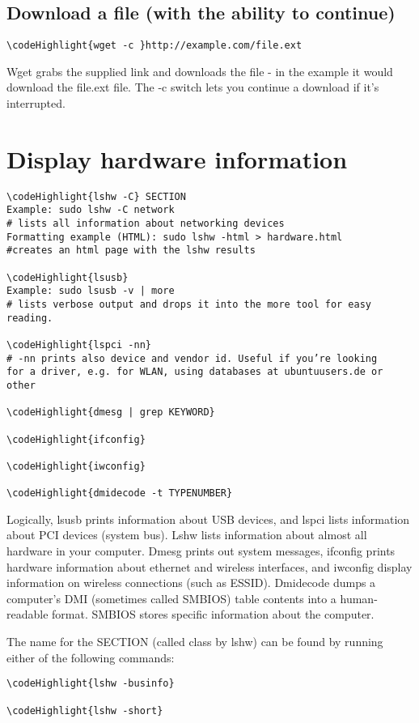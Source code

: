 \documentclass[12pt,a4paper]{article}
\begin{document}
\subsection{Download a file (with the ability to continue)}
\begin{Verbatim}[commandchars=\\\{\}]
\codeHighlight{wget -c }http://example.com/file.ext
\end{Verbatim}
Wget grabs the supplied link and downloads the file - in the example it would download the file.ext file.  The -c switch lets you continue a download if it's interrupted.

\section{Display hardware information}
\label{Display hardware information}
\begin{Verbatim}[commandchars=\\\{\}]
\codeHighlight{lshw -C} SECTION
Example: sudo lshw -C network
# lists all information about networking devices
Formatting example (HTML): sudo lshw -html > hardware.html
#creates an html page with the lshw results

\codeHighlight{lsusb}
Example: sudo lsusb -v | more
# lists verbose output and drops it into the more tool for easy reading.

\codeHighlight{lspci -nn}
# -nn prints also device and vendor id. Useful if you’re looking
for a driver, e.g. for WLAN, using databases at ubuntuusers.de or other

\codeHighlight{dmesg | grep KEYWORD}

\codeHighlight{ifconfig}

\codeHighlight{iwconfig}

\codeHighlight{dmidecode -t TYPENUMBER}
\end{Verbatim}
Logically, lsusb prints information about USB devices, and lspci lists information about PCI devices (system bus). Lshw lists information about almost all hardware in your computer. Dmesg prints out system messages, ifconfig prints hardware information about ethernet and wireless interfaces, and iwconfig display information on wireless connections (such as ESSID). Dmidecode dumps a computer's DMI (sometimes called SMBIOS) table contents into a human-readable format. SMBIOS stores specific information about the computer.

The name for the SECTION (called class by lshw) can be found by running either of the following commands:
\begin{Verbatim}[commandchars=\\\{\}]
\codeHighlight{lshw -businfo}

\codeHighlight{lshw -short}
\end{Verbatim}
\end{document}

